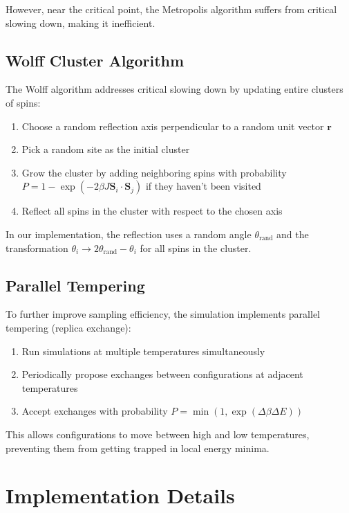 \documentclass[12pt,a4paper]{article}
\begin{document}
However, near the critical point, the Metropolis algorithm suffers from critical slowing down, making it inefficient.

\subsection{Wolff Cluster Algorithm}

The Wolff algorithm addresses critical slowing down by updating entire clusters of spins:
\begin{enumerate}
    \item Choose a random reflection axis perpendicular to a random unit vector $\mathbf{r}$
    \item Pick a random site as the initial cluster
    \item Grow the cluster by adding neighboring spins with probability $P = 1 - \exp(-2\beta J \mathbf{S}_i \cdot \mathbf{S}_j)$ if they haven't been visited
    \item Reflect all spins in the cluster with respect to the chosen axis
\end{enumerate}

In our implementation, the reflection uses a random angle $\theta_{\text{rand}}$ and the transformation $\theta_i \rightarrow 2\theta_{\text{rand}} - \theta_i$ for all spins in the cluster.

\subsection{Parallel Tempering}

To further improve sampling efficiency, the simulation implements parallel tempering (replica exchange):
\begin{enumerate}
    \item Run simulations at multiple temperatures simultaneously
    \item Periodically propose exchanges between configurations at adjacent temperatures
    \item Accept exchanges with probability $P = \min(1, \exp(\Delta\beta \Delta E))$
\end{enumerate}

This allows configurations to move between high and low temperatures, preventing them from getting trapped in local energy minima.

\section{Implementation Details}
\end{document}
